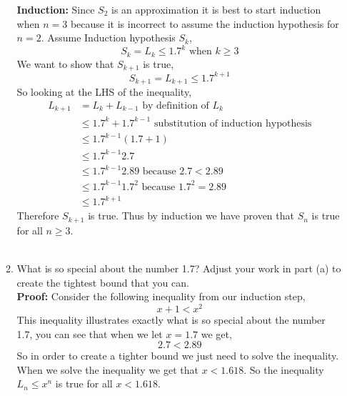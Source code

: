 \documentclass{amsart}
\begin{document}
\begin{enumerate}
\begin{enumerate}
\textbf{Induction:}  Since $S_2$ is an approximation it is best to start induction when $n=3$ because it is incorrect to assume the induction hypothesis for $n=2$. Assume Induction hypothesis $S_k$,
\begin{equation}
S_k=L_k \leq 1.7^k \text{ when $k \geq 3$}
\end{equation}
We want to show that $S_{k+1}$ is true,
\begin{equation*}
S_{k+1}=L_{k+1} \leq 1.7^{k+1} 
\end{equation*}
So looking at the LHS of the inequality,
\begin{align*}
L_{k+1} &= L_{k} + L_{k-1} \text{ by definition of $L_k$}\\
&\leq 1.7^{k}+1.7^{k-1} \text{ substitution of induction hypothesis}\\
&\leq 1.7^{k-1} (1.7+1)\\
&\leq 1.7^{k-1} 2.7\\
&\leq 1.7^{k-1} 2.89 \text{ because $2.7 < 2.89$}\\
&\leq 1.7^{k-1} 1.7^{2} \text { because $1.7^2 = 2.89$}\\
&\leq 1.7^{k+1}
\end{align*}
Therefore $S_{k+1}$ is true. Thus by induction we have proven that $S_n$ is true for all $n \geq 3$.\\\\






	\item What is so special about the number 1.7? Adjust your work in part (a) to create the tightest bound that you can.\\
		
	\textbf{Proof:} Consider the following inequality from our induction step,
	\begin{equation*}
	x+1< x^2
	\end{equation*}
	This inequality illustrates exactly what is so special about the number 1.7, you can see that when we let $x = 1.7$ we get,
	\begin{equation*}
	2.7 < 2.89
	\end{equation*}
	So in order to create a tighter bound we just need to solve the inequality. When we solve the inequality we get that $x < 1.618$. So the inequality $L_n \leq x^n$ is true for all 	$x < 1.618$.\\
	\end{enumerate}	
	
	
	

\end{enumerate}
\end{document}
